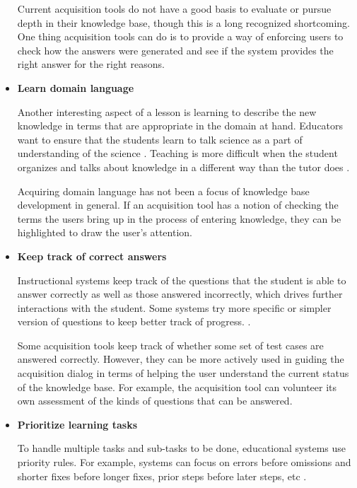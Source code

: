 \documentclass{llncs}
\begin{document}
\begin{itemize}
\vspace*{0.5em}
Current acquisition tools do not have a good basis to
evaluate or pursue depth in their knowledge base, though this is a long
recognized shortcoming.  One thing acquisition tools can do is to provide a
way of enforcing users to check how the answers were generated and see if
the system provides the right answer for the right reasons.

\vspace*{0.5em}
\item {\bf Learn domain language}

Another interesting aspect of a lesson is learning to describe the new
knowledge in terms that are appropriate in the domain at hand.  Educators want
to ensure that the students learn to talk science as a part of understanding
of the science \cite{VanLehn00}.  Teaching is more difficult when the
student organizes and talks about knowledge in a different way than the tutor
does \cite{woolf84}.

\vspace*{0.5em}
Acquiring domain language has not been a focus of knowledge base development
in general.  If an acquisition tool has a notion of checking the terms the
users bring up in the process of entering knowledge, they can be highlighted
to draw the user's attention.
 
\vspace*{0.5em}
\item {\bf Keep track of correct answers}

Instructional systems keep track of the questions that the student is able to
answer correctly as well as those answered incorrectly, which drives further
interactions with the student.  Some systems try more specific or simpler
version of questions to keep better track of progress. \cite{Rose01}.

\vspace*{0.5em}
Some acquisition tools keep track of whether some set of test cases 
are answered correctly.  However, they can be more actively used in guiding
the acquisition dialog in terms of helping the user understand the current
status of the knowledge base.  For example, the acquisition tool can volunteer
its own assessment of the kinds of questions that can be answered.

\vspace*{0.5em}
\item {\bf Prioritize learning tasks}

To handle multiple tasks and sub-tasks to be done, educational
systems use priority rules. For example, systems can focus on errors before
omissions and shorter fixes before longer fixes, prior steps before later
steps, etc \cite{Collins82}.



\end{itemize}
\end{document}
